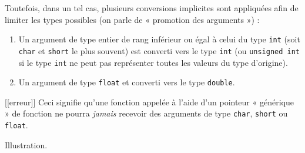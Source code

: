 \documentclass[]{article}
\newenvironment{Shaded}{}{}
\newcommand{\DataTypeTok}[1]{\textcolor[rgb]{0.56,0.13,0.00}{{#1}}}
\newcommand{\DecValTok}[1]{\textcolor[rgb]{0.25,0.63,0.44}{{#1}}}
\newcommand{\FloatTok}[1]{\textcolor[rgb]{0.25,0.63,0.44}{{#1}}}
\newcommand{\SpecialCharTok}[1]{\textcolor[rgb]{0.25,0.44,0.63}{{#1}}}
\newcommand{\StringTok}[1]{\textcolor[rgb]{0.25,0.44,0.63}{{#1}}}
\newcommand{\ImportTok}[1]{{#1}}
\newcommand{\CommentTok}[1]{\textcolor[rgb]{0.38,0.63,0.69}{\textit{{#1}}}}
\newcommand{\ControlFlowTok}[1]{\textcolor[rgb]{0.00,0.44,0.13}{\textbf{{#1}}}}
\newcommand{\PreprocessorTok}[1]{\textcolor[rgb]{0.74,0.48,0.00}{{#1}}}
\newcommand{\NormalTok}[1]{{#1}}
\providecommand{\tightlist}{%
  \setlength{\itemsep}{0pt}\setlength{\parskip}{0pt}}
\begin{document}
Toutefois, dans un tel cas, plusieurs conversions implicites sont
appliquées afin de limiter les types possibles (on parle de « promotion
des arguments ») :

\begin{enumerate}
\def\labelenumi{\arabic{enumi}.}
\tightlist
\item
  Un argument de type entier de rang inférieur ou égal à celui du type
  \texttt{int} (soit \texttt{char} et \texttt{short} le plus souvent)
  est converti vers le type \texttt{int} (ou \texttt{unsigned\ int} si
  le type \texttt{int} ne peut pas représenter toutes les valeurs du
  type d'origine).
\item
  Un argument de type \texttt{float} et converti vers le type
  \texttt{double}.
\end{enumerate}

{[}{[}erreur{]}{]} \textbar{} Ceci signifie qu'une fonction appelée à
l'aide d'un pointeur « générique » de fonction ne pourra \emph{jamais}
recevoir des arguments de type \texttt{char}, \texttt{short} ou
\texttt{float}.

Illustration.

\begin{Shaded}
\end{Shaded}
\end{document}
